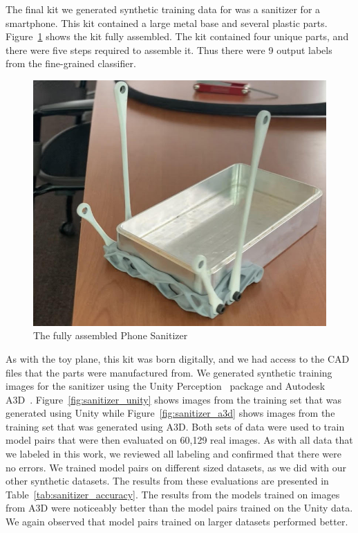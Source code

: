 The final kit we generated synthetic training data for was a sanitizer for a
smartphone.
This kit contained a large metal base and several plastic parts.
Figure~\ref{fig:full_sanitizer} shows the kit fully assembled.
The kit contained four unique parts, and there were five steps required to
assemble it.
Thus there were 9 output labels from the fine-grained classifier.

\begin{figure}
  \includegraphics[width=\columnwidth]{figures/synthetic/full_sanitizer.jpg}
  \caption{
    The fully assembled Phone Sanitizer
  }\label{fig:full_sanitizer}
\end{figure}

As with the toy plane, this kit was born digitally, and we had access to the
CAD files that the parts were manufactured from.
We generated synthetic training images for the sanitizer using the Unity
Perception~\cite{unity} package and Autodesk A3D~\cite{Wang_2022_CVPR}.
Figure~\ref{fig:sanitizer_unity} shows images from the training set that was
generated using Unity while Figure~\ref{fig:sanitizer_a3d}
shows images from the training set that was generated using
A3D.
Both sets of data were used to train model pairs that were then evaluated on
60,129 real images.
As with all data that we labeled in this work, we reviewed all labeling and
confirmed that there were no errors.
We trained model pairs on different sized datasets, as we did with our other
synthetic datasets.
The results from these evaluations are presented in
Table~\ref{tab:sanitizer_accuracy}.
The results from the models trained on images from A3D were noticeably better
than the model pairs trained on the Unity data.
We again observed that model pairs trained on larger datasets performed better.

